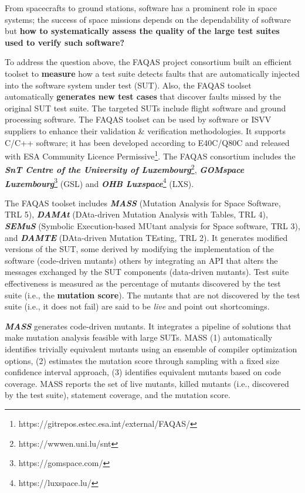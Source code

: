 \documentclass[a4paper]{report}
\begin{document}

From spacecrafts to ground stations, software has a prominent role in space systems; the success of space missions depends on the dependability of software but \textbf{how to systematically assess the quality of the large test suites used to verify such software?} 

To address the question above, the FAQAS project consortium built an efficient toolset to 
\textbf{measure} how a test suite detects faults that are automatically injected into the software system under test (SUT). Also, the FAQAS toolset automatically \textbf{generates new test cases} that discover faults missed by the original SUT test suite. The targeted SUTs include flight software and ground processing software.
The FAQAS toolset can be used by software or ISVV suppliers to enhance their validation  \&  verification methodologies.
It supports C/C++ software; it has been developed according to E40C/Q80C and released with ESA Community Licence Permissive\footnote{https://gitrepos.estec.esa.int/external/FAQAS/}.
The FAQAS consortium includes the \textbf{\emph{SnT Centre of the University of Luxembourg}}\footnote{https://wwwen.uni.lu/snt}, \textbf{\emph{GOMspace Luxembourg}}\footnote{https://gomspace.com/} (GSL) and \textbf{\emph{OHB Luxspace}}\footnote{https://luxspace.lu/} (LXS).

The FAQAS toolset includes 
\textbf{\emph{MASS}} (Mutation Analysis for Space Software, TRL 5), 
\textbf{\emph{DAMAt}} (DAta-driven Mutation Analysis with Tables, TRL 4), 
\textbf{\emph{SEMuS}} (Symbolic Execu\-tion-based MUtant analysis for Space software, TRL 3),
and \textbf{\emph{DAMTE}} (DAta-driven Mutation TEsting, TRL 2).
It generates modified versions of the SUT, some derived by modifying the implementation of the software (code-driven mutants) others by integrating an API that alters the messages exchanged by the SUT components (data-driven mutants). 
Test suite effectiveness is measured as the percentage of mutants discovered by the test suite (i.e., the \textbf{mutation score}). The mutants that are not discovered by the test suite (i.e., it does not fail) are said to be \emph{live} and point out shortcomings.

\textbf{\emph{MASS}} generates code-driven mutants. It integrates a pipeline of solutions that make mutation analysis feasible with large SUTs. MASS (1) automatically identifies trivially equivalent mutants using an ensemble of compiler optimization options, (2) estimates the mutation score through sampling with a fixed size confidence interval approach, (3) identifies equivalent mutants based on code coverage. 
MASS reports the set of live mutants, killed mutants (i.e., discovered by the test suite), statement coverage, and the mutation score.
\end{document}

